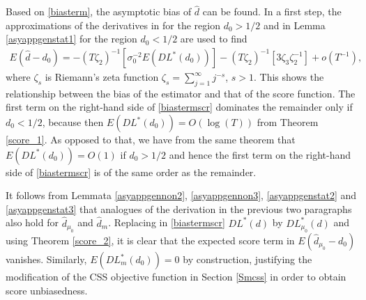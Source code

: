 {{Based on \eqref{biasterm}, the asymptotic bias of $\hat d$ can be found. In a first step, the approximations of the derivatives in \textcite[Lemma B.4]{johansen2016role} for the region $d_0 > 1/2$ and in Lemma \ref{asyappgenstat1} for the region $d_0 < 1/2$ are used to find
\begin{align}
   E \left(\hat{d}-d_0\right)
                            =  -(T \zeta_{2})^{-1}\left[ \sigma_0^{-2} E \left(DL^*(d_0)\right)\right] -(T \zeta_{2})^{-1}\left[ 3 \zeta_{3} \zeta_{2}^{-1} \right] +  o(T^{-1}), \label{biastermscr} 
\end{align}
where $\zeta_{s}$ is Riemann's zeta function $\zeta_{s} = \sum_{j = 1}^{\infty} j^{-s}$, $s>1$. This shows the relationship between the bias of the estimator and that of the score function. The first term on the right-hand side of \eqref{biastermscr} dominates the remainder only if $d_0 < 1/2$, because then $E\left(DL^*(d_0)\right) = O(\log(T))$ from Theorem \ref{score_1}. As opposed to that, we have from the same theorem that $E\left(DL^*(d_0)\right) = O(1)$ if $d_0 > 1/2$ and hence the first term on the right-hand side of \eqref{biastermscr} is of the same order as the remainder.

It follows from Lemmata \ref{asyappgennon2}, \ref{asyappgennon3}, \ref{asyappgenstat2} and \ref{asyappgenstat3} that analogues of the derivation in the previous two paragraphs also hold for $\hat{d}_{\mu_0}$ and $\hat{d}_{m}$. Replacing in \eqref{biastermscr} $DL^*(d)$ by $DL_{\mu_0}^*(d)$  and using Theorem \ref{score_2}, it is clear that the expected score term in $E \left(\hat{d}_{\mu_0}-d_0\right)$ vanishes. Similarly, $E\left(DL_m^*(d_0)\right) =0$ by construction, justifying the modification of the CSS objective function in Section \ref{Smcss} in order to obtain score unbiasedness.

}}

